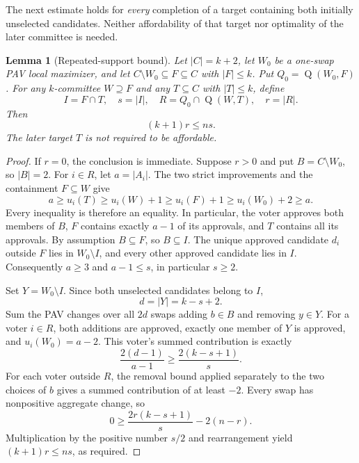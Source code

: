 \documentclass[11pt]{article}
\newtheorem{lemma}[theorem]{Lemma}
\newcommand{\gain}{\operatorname{Q}}
\begin{document}
The next estimate holds for \emph{every} completion of a target containing
both initially unselected candidates. Neither affordability of that target
nor optimality of the later committee is needed.

\begin{lemma}[Repeated-support bound]\label{lem:repeat}
Let $|C|=k+2$, let $W_0$ be a one-swap PAV local maximizer, and let
$C\setminus W_0\subseteq F\subseteq C$ with $|F|\le k$.
Put $Q_0=\gain(W_0,F)$. For any $k$-committee
$W\supseteq F$ and any $T\subseteq C$ with $|T|\le k$, define
\[
 I=F\cap T,\quad s=|I|,\quad
 R=Q_0\cap\gain(W,T),\quad r=|R|.
\]
Then
\begin{equation}\label{eq:repeat}
 (k+1)r\le ns.
\end{equation}
The later target $T$ is not required to be affordable.
\end{lemma}
\begin{proof}
If $r=0$, the conclusion is immediate. Suppose $r>0$ and put
$B=C\setminus W_0$, so $|B|=2$. For $i\in R$, let $a=|A_i|$. The two
strict improvements and the containment $F\subseteq W$ give
\[
 a\ge u_i(T)\ge u_i(W)+1\ge u_i(F)+1
 \ge u_i(W_0)+2\ge a.
\]
Every inequality is therefore an equality. In particular, the voter
approves both members of $B$, $F$ contains exactly $a-1$ of its approvals,
and $T$ contains all its approvals. By assumption $B\subseteq F$,
so $B\subseteq I$. The unique approved candidate $d_i$ outside $F$ lies
in $W_0\setminus I$, and every other approved candidate lies in $I$.
Consequently $a\ge3$ and $a-1\le s$, in particular $s\ge2$.

Set $Y=W_0\setminus I$. Since both unselected candidates belong to $I$,
\[
 d=|Y|=k-s+2.
\]
Sum the PAV changes over all $2d$ swaps adding $b\in B$ and removing
$y\in Y$. For a voter $i\in R$, both additions are approved, exactly one
member of $Y$ is approved, and $u_i(W_0)=a-2$. This voter's summed
contribution is exactly
\[
 \frac{2(d-1)}{a-1}\ge\frac{2(k-s+1)}s.
\]
For each voter outside $R$, the removal bound applied separately to the
two choices of $b$ gives a summed contribution of at least $-2$. Every
swap has nonpositive aggregate change, so
\[
 0\ge\frac{2r(k-s+1)}s-2(n-r).
\]
Multiplication by the positive number $s/2$ and rearrangement yield
$(k+1)r\le ns$, as required.
\end{proof}
\end{document}
